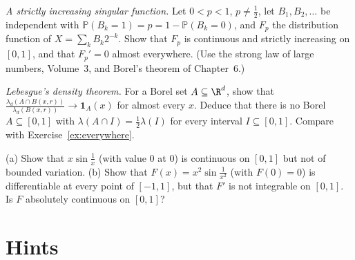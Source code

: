 \begin{exercise}[$\star\star\star$]\label{ex:salem}
\emph{A strictly increasing singular function.} Let $0<p<1$, $p\ne\frac12$, let $B_1,B_2,\ldots$ be independent with $\mathbb P(B_k=1)=p=1-\mathbb P(B_k=0)$, and $F_p$ the distribution function of $X=\sum_kB_k2^{-k}$.
Show that $F_p$ is continuous and strictly increasing on $[0,1]$, and that $F_p'=0$ almost everywhere. (Use the strong law of large numbers, Volume~3, and Borel's theorem of Chapter~6.)
\end{exercise}

\begin{exercise}[$\star\star$]\label{ex:density}
\emph{Lebesgue's density theorem.} For a Borel set $A\subseteq\R^d$, show that $\frac{\lambda_d(A\cap B(x,r))}{\lambda_d(B(x,r))}\to\mathbf 1_A(x)$ for almost every $x$. Deduce that there is no Borel $A\subseteq[0,1]$ with
$\lambda(A\cap I)=\frac12\lambda(I)$ for every interval $I\subseteq[0,1]$. Compare with Exercise~\ref{ex:everywhere}.
\end{exercise}

\begin{exercise}[$\star\star$]\label{ex:variation}
(a) Show that $x\sin\frac1x$ (with value $0$ at $0$) is continuous on $[0,1]$ but not of bounded variation. (b) Show that $F(x)=x^2\sin\frac1{x^2}$ (with $F(0)=0$) is differentiable at every point of $[-1,1]$, but that
$F'$ is not integrable on $[0,1]$. Is $F$ absolutely continuous on $[0,1]$?
\end{exercise}

\section{Hints}


